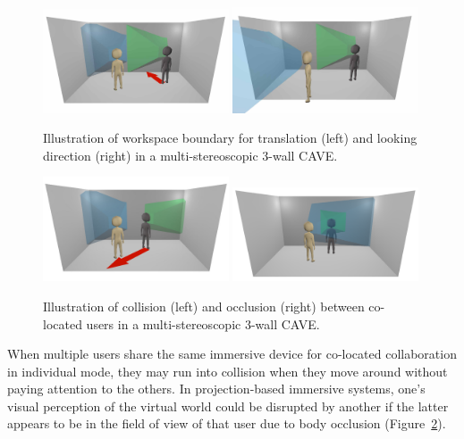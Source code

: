 \begin{figure}[htb]
  \centering
  \includegraphics[width=0.49\textwidth]{figures/ch2/illu_wall_col}
  \includegraphics[width=0.49\textwidth]{figures/ch2/illu_empty}
  \caption{\label{fig:2_illu_system}Illustration of workspace boundary for translation (left) and looking direction (right) in a multi-stereoscopic 3-wall CAVE.}
\end{figure}

\begin{figure}[htb]
  \centering
  \includegraphics[width=0.49\textwidth]{figures/ch2/illu_user_col}
  \includegraphics[width=0.49\textwidth]{figures/ch2/illu_occ}
  \caption{\label{fig:2_illu_users}Illustration of collision (left) and occlusion (right) between co-located users in a multi-stereoscopic 3-wall CAVE.}
\end{figure}

When multiple users share the same immersive device for co-located collaboration in individual mode, they may run into collision when they move around without paying attention to the others. In projection-based immersive systems, one's visual perception of the virtual world could be disrupted by another if the latter appears to be in the field of view of that user due to body occlusion (Figure~\ref{fig:2_illu_users}).

